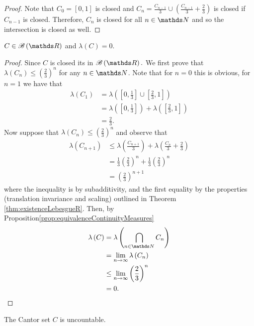 \begin{proof}
Note that $C_{0}=\left[0,1\right]$ is closed and $C_{n}=\frac{C_{n-1}}{3}\cup\left(\frac{C_{n-1}}{3}+\frac{2}{3}\right)$
is closed if $C_{n-1}$ is closed. Therefore, $C_{n}$ is closed for
all $n\in\N$ and so the intersection is closed as well.
\end{proof}
\begin{prop}
\label{prop:cantorSetMeasureZero}$C\in\borel\left(\R\right)$ and
$\lambda\left(C\right)=0$.
\end{prop}

\begin{proof}
Since $C$ is closed its in $\borel\left(\R\right).$ We first prove
that $\lambda\left(C_{n}\right)\leq\left(\frac{2}{3}\right)^{n}$
for any $n\in\N$. Note that for $n=0$ this is obvious, for $n=1$
we have that 
\begin{align*}
\lambda\left(C_{1}\right) & =\lambda\left(\left[0,\frac{1}{3}\right]\cup\left[\frac{2}{3},1\right]\right)\\
 & =\lambda\left(\left[0,\frac{1}{3}\right]\right)+\lambda\left(\left[\frac{2}{3},1\right]\right)\\
 & =\frac{2}{3}.
\end{align*}
Now suppose that $\lambda\left(C_{n}\right)\leq\left(\frac{2}{3}\right)^{n}$
and observe that 
\begin{align*}
\lambda\left(C_{n+1}\right) & \leq\lambda\left(\frac{C_{n+1}}{3}\right)+\lambda\left(\frac{C_{n}}{3}+\frac{2}{3}\right)\\
 & =\frac{1}{3}\left(\frac{2}{3}\right)^{n}+\frac{1}{3}\left(\frac{2}{3}\right)^{n}\\
 & =\left(\frac{2}{3}\right)^{n+1}
\end{align*}
where the inequality is by subadditivity, and the first equality by
the properties (translation invariance and scaling) outlined in Theorem
\ref{thm:existenceLebesgueR}. Then, by Proposition\ref{prop:equivalenceContinuityMeasures}
\begin{align*}
\lambda\left(C\right) & =\lambda\left(\bigcap_{n\in\N}C_{n}\right)\\
 & =\lim_{n\to\infty}\lambda\left(C_{n}\right)\\
 & \leq\lim_{n\to\infty}\left(\frac{2}{3}\right)^{n}\\
 & =0.
\end{align*}
\end{proof}
\begin{prop}
\label{prop:cantorSetUncountable}The Cantor set $C$ is uncountable.
\end{prop}

